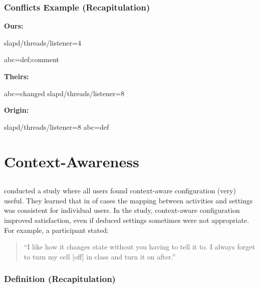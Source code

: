 \begin{frame}[fragile]
	\frametitle{Conflicts Example (Recapitulation)}

	\textbf{Ours:}
	\begin{code}[gobble=4,language=CfgElektra]
	slapd/threads/listener=4

	abc=def;comment
	\end{code}

	\vspace{2em}

	\textbf{Theirs:}
	\begin{code}[gobble=4,language=CfgElektra]
	abc=changed
	slapd/threads/listener=8
	\end{code}

	\vspace{2em}

	\pause
	\textbf{Origin:}
	\begin{code}[gobble=4,language=CfgElektra]
	slapd/threads/listener=8
	abc=def
	\end{code}
\end{frame}

\section{Context-Awareness}

\subsection{}

\begin{frame}
	\citet{khalil2005context} conducted a study where all users found context-aware configuration (very) useful.
	They learned that in  of cases the mapping between activities and settings was consistent for individual users.
	In the study, context-aware configuration improved satisfaction, even if deduced settings sometimes were not appropriate.
	For example, a participant stated:

	\begin{quote}
	``I like how it changes state without you having to tell it to. I always forget to turn my cell [off] in class and turn it on after.''
	\end{quote}
\end{frame}

\begin{frame}
	\frametitle{Definition (Recapitulation)}
\end{frame}

